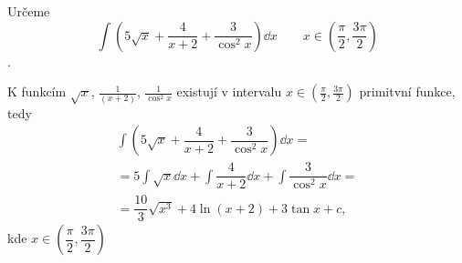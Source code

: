 \begin{mdframed}[style=mdexam]
  \begin{example}\label{MAI:exam146} 
    Určeme \[\int\left(5\sqrt{x} + \dfrac{4}{x+2} + \dfrac{3}{\cos^2x}\right)\dd{x} \qquad
    x\in\left(\dfrac{\pi}{2}, \dfrac{3\pi}{2}\right)\]. 
    
    K funkcím \(\sqrt{x}\), \(\frac{1}{(x+2)}\), \(\frac{1}{\cos^2x}\) existují v intervalu
    \(x\in(\frac{\pi}{2}, \frac{3\pi}{2})\) primitvní funkce, tedy  
    \begin{multline*}
      \int\left(5\sqrt{x} + \dfrac{4}{x+2} + \dfrac{3}{\cos^2x}\right)\dd{x} =       \\
          = 5\int\sqrt{x}\dd{x} + \int\dfrac{4}{x+2}\dd{x} + \int\dfrac{3}{\cos^2x}\dd{x} = \\
          = \dfrac{10}{3}\sqrt{x^3} + 4\ln(x+2) + 3\tan x + c, 
    \end{multline*}
    kde \(x\in\left(\dfrac{\pi}{2}, \dfrac{3\pi}{2}\right)\)
  \end{example}
\end{mdframed}